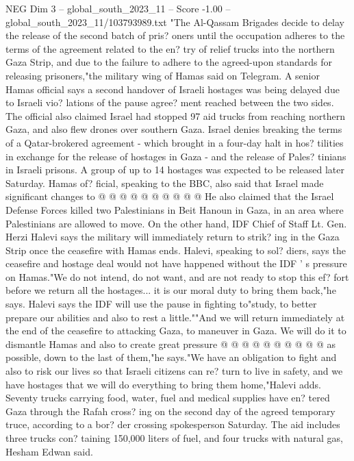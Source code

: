 \begin{textsample}{NEG Dim 3 – global\_south\_2023\_11 – Score -1.00 – global\_south\_2023\_11/103793989.txt}  \label{ex:f3_neg_082}
"The Al-Qassam Brigades decide to delay the release of the second batch of pris? oners until the occupation adheres to the terms of the agreement related to the en? try of relief trucks into the northern Gaza Strip, and due to the failure to adhere to the agreed-upon standards for releasing prisoners,"the military wing of Hamas said on Telegram.
A senior Hamas official says a second handover of Israeli hostages was being delayed due to Israeli vio? lations of the pause agree? ment reached between the two sides.
The official also claimed Israel had stopped 97 aid trucks from reaching northern Gaza, and also flew drones over southern Gaza.
Israel denies breaking the terms of a Qatar-brokered agreement - which brought in a four-day halt in hos? tilities in exchange for the release of hostages in Gaza - and the release of Pales? tinians in Israeli prisons.
A group of up to 14 hostages was expected to be released later Saturday.
Hamas of? ficial, speaking to the BBC, also said that Israel made significant changes to @ @ @ @ @ @ @ @ @ @ He also claimed that the Israel Defense Forces killed two Palestinians in Beit Hanoun in Gaza, in an area where Palestinians are allowed to move.
On the other hand, IDF Chief of Staff Lt.
Gen.
Herzi Halevi says the military will immediately return to strik? ing in the Gaza Strip once the ceasefire with Hamas ends.
Halevi, speaking to sol? diers, says the ceasefire and hostage deal would not have happened without the IDF ' s pressure on Hamas."We do not intend, do not want, and are not ready to stop this ef? fort before we return all the hostages... it is our moral duty to bring them back,"he says.
Halevi says the IDF will use the pause in fighting to"study, to better prepare our abilities and also to rest a little.""And we will return immediately at the end of the ceasefire to attacking Gaza, to maneuver in Gaza.
We will do it to dismantle Hamas and also to create great pressure @ @ @ @ @ @ @ @ @ @ as possible, down to the last of them,"he says."We have an obligation to fight and also to risk our lives so that Israeli citizens can re? turn to live in safety, and we have hostages that we will do everything to bring them home,"Halevi adds.
Seventy trucks carrying food, water, fuel and medical supplies have en? tered Gaza through the Rafah cross? ing on the second day of the agreed temporary truce, according to a bor? der crossing spokesperson Saturday.
The aid includes three trucks con? taining 150,000 liters of fuel, and four trucks with natural gas, Hesham Edwan said.

\end{textsample}
